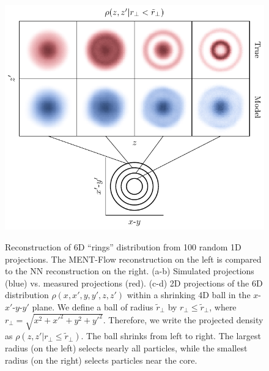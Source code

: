 \documentclass[%
    reprint,
    twocolumn,
    nofootinbib,
    amsmath,
    amssymb,
    aps,
    prstab,
]{revtex4-2}
\begin{document}
\begin{figure}
{        \includegraphics[width=\columnwidth]{fig_rec_nd_1d_flow_rings_100-proj_slice_09.pdf}%
        \label{fig:rec_6d_1d_rings_100meas-e}%
    }%
    \hfill
    \caption{Reconstruction of 6D ``rings'' distribution from 100 random 1D projections. The MENT-Flow reconstruction on the left is compared to the NN reconstruction on the right. (a-b) Simulated projections (blue) vs. measured projections (red). (c-d) 2D projections of the 6D distribution $\rho(x, x', y, y', z, z')$ within a shrinking 4D ball in the $x$-$x'$-$y$-$y'$ plane. We define a ball of radius $\tilde{r}_\perp$ by ${r}_\perp \le \tilde{r}_\perp$, where ${r}_\perp = \sqrt{x^2 + x'^2 + y^2 + y'^2}$. Therefore, we write the projected density as $\rho(z, z' | r_\perp \le \tilde{r}_\perp)$. The ball shrinks from left to right. The largest radius (on the left) selects nearly all particles, while the smallest radius (on the right) selects particles near the core.}
    \label{fig:rec_6d_1d_rings_100meas}
\end{figure}
%
\end{document}
